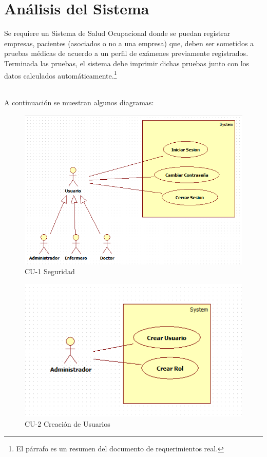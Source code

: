 \section{Análisis del Sistema}
	Se requiere un Sistema de Salud Ocupacional donde se puedan registrar
	empresas, pacientes (asociados o no a una empresa) que, deben ser sometidos a
	pruebas médicas de acuerdo a un perfil de exámenes previamente registrados.
	Terminada las pruebas, el sistema debe imprimir dichas pruebas junto con los
	datos calculados automáticamente.\footnote{El párrafo es un resumen del
	documento de requerimientos real.} \\\

	A continuación se muestran algunos diagramas:
	
	\begin{figure}[ht!]
	    \centering
		\includegraphics{../imgs/casos-uso/1.png}
		\caption{CU-1 Seguridad}
	\end{figure}
	
\newpage
	
	\begin{figure}[ht!]
	    \centering
		\includegraphics{../imgs/casos-uso/2.png}
		\caption{CU-2 Creación de Usuarios}
	\end{figure}
	
